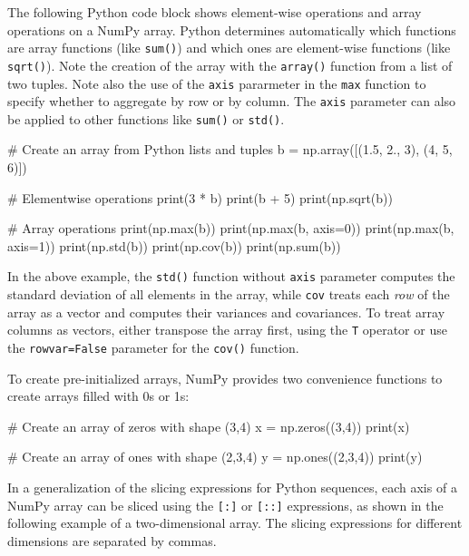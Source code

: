 The following Python code block shows element-wise operations and array operations on a NumPy array. Python determines automatically which functions are array functions (like \texttt{sum()}) and which ones are element-wise functions (like \texttt{sqrt()}). Note the creation of the array with the \texttt{array()} function from a list of two tuples. Note also the use of the \texttt{axis} pararmeter in the \texttt{max} function to specify whether to aggregate by row or by column. The \texttt{axis} parameter can also be applied to other functions like \texttt{sum()} or \texttt{std()}.

\begin{samepage}
\begin{pythoncode}
# Create an array from Python lists and tuples
b = np.array([(1.5, 2., 3), (4, 5, 6)])

# Elementwise operations
print(3 * b)
print(b + 5)
print(np.sqrt(b))

# Array operations
print(np.max(b))
print(np.max(b, axis=0))
print(np.max(b, axis=1))
print(np.std(b))
print(np.cov(b))
print(np.sum(b))
\end{pythoncode}
\end{samepage}

In the above example, the \texttt{std()} function without \texttt{axis} parameter computes the standard deviation of all elements in the array, while \texttt{cov} treats each \emph{row} of the array as a vector and computes their variances and covariances. To treat array columns as vectors, either transpose the array first, using the \texttt{T} operator or use the \texttt{rowvar=False} parameter for the \texttt{cov()} function. 

To create pre-initialized arrays, NumPy provides two convenience functions to create arrays filled with 0s or 1s:
\begin{samepage}
\begin{pythoncode}
# Create an array of zeros with shape (3,4)
x = np.zeros((3,4))
print(x)

# Create an array of ones with shape (2,3,4)
y = np.ones((2,3,4))
print(y)
\end{pythoncode}
\end{samepage}

In a generalization of the slicing expressions for Python sequences, each axis of a NumPy array can be sliced using the \texttt{[:]} or \texttt{[::]} expressions, as shown in the following example of a two-dimensional array. The slicing expressions for different dimensions are separated by commas.

